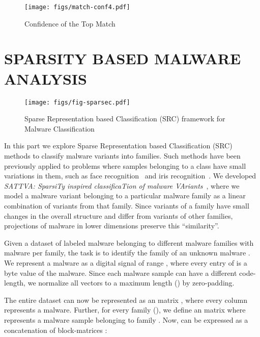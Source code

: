 \documentclass[journal]{IEEEtran}
\begin{document}
\begin{figure}[h]
\centering
{\texttt{[image: figs/match-conf4.pdf]}}
\caption{Confidence of the Top Match}
\label{match-conf}
\vspace{-10pt}
\end{figure}


\section*{SPARSITY BASED MALWARE ANALYSIS} 


\begin{figure*}[ht]
\centering
{\texttt{[image: figs/fig-sparsec.pdf]}}
\vspace{-10pt}
\caption{Sparse Representation based Classification (SRC) framework for Malware Classification}
\label{fig-sp}
\vspace{-10pt}
\end{figure*}



In this part we explore Sparse Representation based Classification (SRC) methods to classify malware variants into families. 
Such methods have been previously applied to problems where samples belonging to a class have small variations in them, such as face recognition~\cite{2009-pami-wright-face} and iris recognition~\cite{2011-jay-pami}.
We developed \emph{SATTVA: SparsiTy inspired classificaTion of malware VAriants}~\cite{sattva}, where we model a malware variant belonging to a particular malware family as a linear combination of variants from that family.
Since variants of a family have small changes in the overall structure and differ from variants of other families, projections of malware in lower dimensions preserve this ``similarity''. 

Given a dataset of  labeled malware belonging to  different malware families with  malware per family, the task is to identify the family of an unknown malware .
We represent a malware as a digital signal  of range , where every entry of  is a byte value of the malware.  
Since each malware sample can have a different code-length, we normalize all vectors to a  maximum length () by zero-padding.

The entire dataset can now be represented as an  matrix , where every column represents a malware. Further, for every family  (), we define an  matrix  where  represents a malware sample belonging to family . Now,  can be expressed as a concatenation of block-matrices :
 
\end{document}
